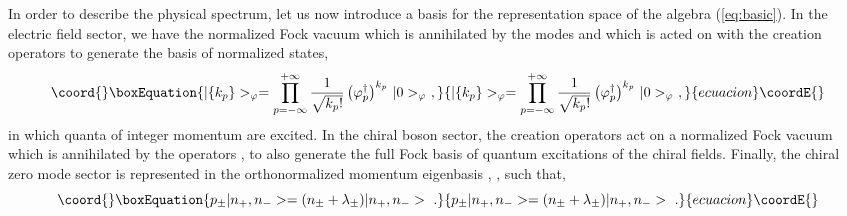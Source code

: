 \documentclass[a4paper,11pt]{article}
\begin{document}
In order to describe the physical spectrum, let us now introduce a basis
for the representation space of the algebra (\ref{eq:basic}). In the
electric field sector, we have the normalized Fock vacuum \coordHE{} 
which is annihilated by the modes \coordHE{} and
which is acted on with the creation operators \coordHE{} to generate 
the basis of normalized states,
\begin{equation}\coord{}\boxEquation{
|\{k_p\}>_\varphi=\prod_{p=-\infty}^{+\infty}
\frac{1}{\sqrt{k_p!}}\left(\varphi^\dagger_p\right)^{k_p}\,
|0>_\varphi\ ,
}{
|\{k_p\}>_\varphi=\prod_{p=-\infty}^{+\infty}
\frac{1}{\sqrt{k_p!}}\left(\varphi^\dagger_p\right)^{k_p}\,
|0>_\varphi\ ,
}{ecuacion}\coordE{}\end{equation}
in which \coordHE{} quanta of integer momentum \coordHE{} are 
excited. In the chiral boson sector, the creation operators 
\coordHE{} act on a normalized Fock vacuum \coordHE{} which is 
annihilated by the operators \coordHE{}, to also generate the full Fock 
basis of quantum excitations of the chiral fields. Finally, the chiral 
zero mode sector \coordHE{} is represented in the orthonormalized 
momentum eigenbasis \coordHE{}, 
\coordHE{}, such that,
\begin{equation}\coord{}\boxEquation{
p_\pm|n_+,n_->=(n_\pm+\lambda_\pm)|n_+,n_->\ .
}{
p_\pm|n_+,n_->=(n_\pm+\lambda_\pm)|n_+,n_->\ .
}{ecuacion}\coordE{}\end{equation}
\end{document}
